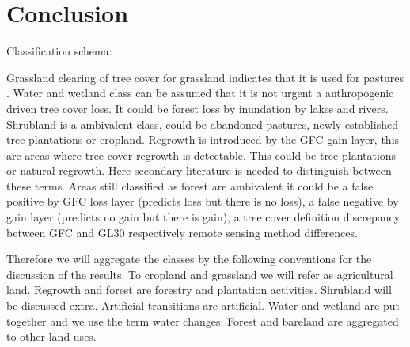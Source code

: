 \chapter{Conclusion}
\label{ch:conclusion}
Classification schema:

Grassland clearing of tree cover for grassland indicates that it is used for pastures . Water and wetland class can be assumed that it is not urgent a anthropogenic driven tree cover loss. It could be forest loss by inundation by lakes and rivers.\cite{Sy2015}
Shrubland is a ambivalent class, could be abandoned pastures, newly established tree plantations or cropland. Regrowth is introduced by the \ac{GFC} gain layer, this are areas where tree cover regrowth is detectable. This could be tree plantations or natural regrowth. Here secondary literature is needed to distinguish between these terms. Areas still classified as forest are ambivalent it could be a false positive by \ac{GFC} loss layer (predicts loss but there is no loss), a false negative by gain layer (predicts no gain but there is gain), a tree cover definition discrepancy between \ac{GFC} and \ac{GL30} respectively remote sensing method differences.

Therefore we will aggregate the classes by the following conventions for the discussion of the results. To cropland and grassland we will refer as agricultural land. Regrowth and forest are forestry and plantation activities. Shrubland will be discussed extra. Artificial transitions are artificial. Water and wetland are put together and we use the term water changes. Forest and bareland are aggregated to other land uses.